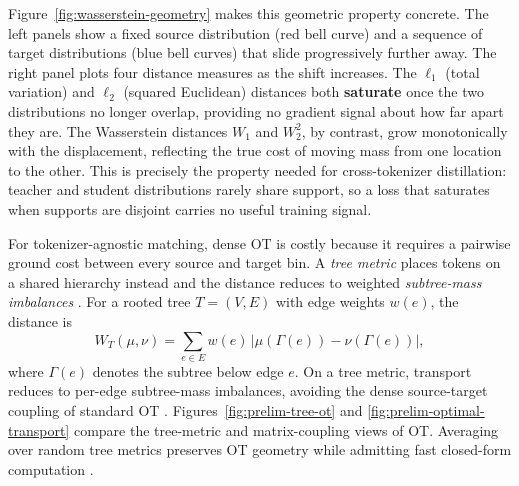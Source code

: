 Figure~\ref{fig:wasserstein-geometry} makes this geometric property concrete.
The left panels show a fixed source distribution (red bell curve) and a
sequence of target distributions (blue bell curves) that slide progressively
further away. The right panel plots four distance measures as the shift
increases. The \(\ell_1\) (total variation) and \(\ell_2\) (squared
Euclidean) distances both \textbf{saturate} once the two distributions no longer
overlap, providing no gradient signal about how far apart they are. The
Wasserstein distances \(W_1\) and \(W_2^2\), by contrast, grow monotonically
with the displacement, reflecting the true cost of moving mass from one
location to the other. This is precisely the property needed for
cross-tokenizer distillation: teacher and student distributions rarely share
support, so a loss that saturates when supports are disjoint carries no
useful training signal.

For tokenizer-agnostic matching, dense OT is costly because it requires a pairwise
ground cost between every source and target bin. A \textit{tree metric} places tokens on a shared hierarchy instead and the
distance reduces to weighted \textit{subtree-mass imbalances}
\cite{takezawa2021supervisedtreewasserstein,peyre2019computationaloptimaltransport}.
For a rooted tree \(T=(V,E)\) with edge weights \(w(e)\), the distance is
\begin{equation}
W_T(\mu,\nu)
=
\sum_{e\in E}
w(e)\,
\left|
\mu\!\left(\Gamma(e)\right)-\nu\!\left(\Gamma(e)\right)
\right|,
\label{eq:prelim-tree-wasserstein}
\end{equation}
where \(\Gamma(e)\) denotes the subtree below edge \(e\). On a tree metric, transport reduces to per-edge subtree-mass imbalances,
avoiding the dense source-target coupling of standard OT
\cite{takezawa2021supervisedtreewasserstein,leyamadafukumizucuturi2019treesliced}.
Figures~\ref{fig:prelim-tree-ot} and
\ref{fig:prelim-optimal-transport} compare the tree-metric and matrix-coupling
views of OT. Averaging over random tree metrics preserves OT geometry while
admitting fast closed-form computation \cite{leyamadafukumizucuturi2019treesliced}.


